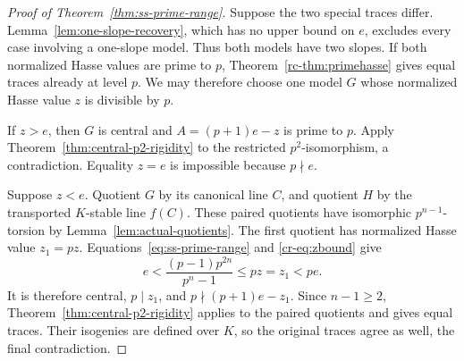 \begin{proof}[Proof of Theorem~\ref{thm:ss-prime-range}]
Suppose the two special traces differ. Lemma~\ref{lem:one-slope-recovery}, which has no upper bound on $e$, excludes every case involving a one-slope model. Thus both models have two slopes. If both normalized Hasse values are prime to $p$, Theorem~\ref{rc-thm:primehasse} gives equal traces already at level $p$. We may therefore choose one model $G$ whose normalized Hasse value $z$ is divisible by $p$.

If $z>e$, then $G$ is central and $A=(p+1)e-z$ is prime to $p$. Apply Theorem~\ref{thm:central-p2-rigidity} to the restricted $p^2$-isomorphism, a contradiction. Equality $z=e$ is impossible because $p\nmid e$.

Suppose $z<e$. Quotient $G$ by its canonical line $C$, and quotient $H$ by the transported $K$-stable line $f(C)$. These paired quotients have isomorphic $p^{n-1}$-torsion by Lemma~\ref{lem:actual-quotients}. The first quotient has normalized Hasse value $z_1=pz$. Equations~\eqref{eq:ss-prime-range} and \eqref{cr-eq:zbound} give
\[
 e<\frac{(p-1)p^{2n}}{p^n-1}\le pz=z_1<pe.
\]
It is therefore central, $p\mid z_1$, and $p\nmid(p+1)e-z_1$. Since $n-1\ge2$, Theorem~\ref{thm:central-p2-rigidity} applies to the paired quotients and gives equal traces. Their isogenies are defined over $K$, so the original traces agree as well, the final contradiction.
\end{proof}


